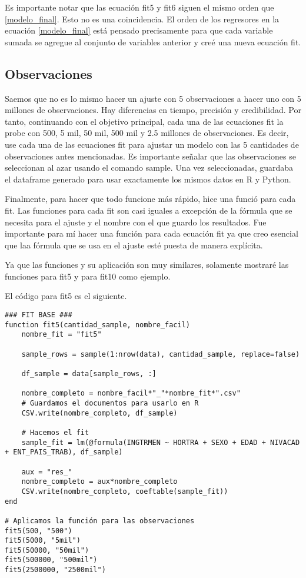 Es importante notar que las ecuación \textsf{fit5} y \textsf{fit6} siguen el mismo orden que \ref{modelo_final}. Esto no es una coincidencia. El orden de los regresores en la ecuación \ref{modelo_final} está pensado precisamente para que cada variable sumada se agregue al conjunto de variables anterior y creé una nueva ecuación \textsf{fit}.


\subsection{Observaciones}
Saemos que no es lo mismo hacer un ajuste con 5 observaciones a hacer uno con 5 millones de observaciones. Hay diferencias en tiempo, precisión y credibilidad. Por tanto, continuando con el objetivo principal, cada una de las ecuaciones \textsf{fit} la probe con 500, 5 mil, 50 mil, 500 mil y 2.5 millones de observaciones. Es decir, use cada una de las ecuaciones \textsf{fit} para ajustar un modelo con las 5 cantidades de observaciones antes mencionadas. Es importante señalar que las observaciones se seleccionan al azar usando el comando \textsf{sample}. Una vez seleccionadas, guardaba el dataframe generado para usar exactamente los mismos datos en \textsf{R} y \textsf{Python}. 


Finalmente, para hacer que todo funcione más rápido, hice una funció para cada \textsf{fit}. Las funciones para cada \textsf{fit} son casi iguales a excepción de la fórmula que se necesita para el ajuste y el nombre con el que guardo los resultados. Fue importante para mí hacer una función para cada ecuación \textsf{fit} ya que creo esencial que laa fórmula que se usa en el ajuste esté puesta de manera explícita. 


Ya que las funciones y su aplicación son muy similares, solamente mostraré las funciones para \textsf{fit5} y para \textsf{fit10} como ejemplo. 

El código para \textsf{fit5} es el siguiente. 

\begin{verbatim}
### FIT BASE ###
function fit5(cantidad_sample, nombre_facil)
    nombre_fit = "fit5"
    
    sample_rows = sample(1:nrow(data), cantidad_sample, replace=false)

    df_sample = data[sample_rows, :]
    
    nombre_completo = nombre_facil*"_"*nombre_fit*".csv"
    # Guardamos el documentos para usarlo en R
    CSV.write(nombre_completo, df_sample)

    # Hacemos el fit
    sample_fit = lm(@formula(INGTRMEN ~ HORTRA + SEXO + EDAD + NIVACAD + ENT_PAIS_TRAB), df_sample)

    aux = "res_"
    nombre_completo = aux*nombre_completo
    CSV.write(nombre_completo, coeftable(sample_fit))
end 

# Aplicamos la función para las observaciones
fit5(500, "500")
fit5(5000, "5mil")
fit5(50000, "50mil")
fit5(500000, "500mil")
fit5(2500000, "2500mil")

\end{verbatim}

